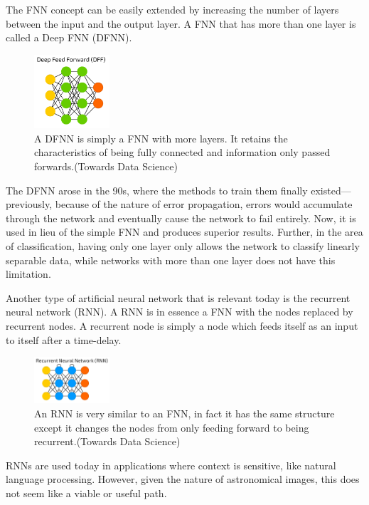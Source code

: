 \documentclass[a4paper,11pt]{article}
\begin{document}
The FNN concept can be easily extended by increasing the number of layers between the input and the output layer. A FNN that has more than one layer is called a Deep FNN (DFNN). 

\begin{figure}[ht]
\centering
\includegraphics[width=0.25\textwidth]{DFF.png}
\caption{\label{fig:FNN}A DFNN is simply a FNN with more layers. It retains the characteristics of being fully connected and information only passed forwards.(Towards Data Science)}
\end{figure}

The DFNN arose in the 90s, where the methods to train them finally existed—previously, because of the nature of error propagation, errors would accumulate through the network and eventually cause the network to fail entirely. Now, it is used in lieu of the simple FNN and produces superior results. Further, in the area of classification, having only one layer only allows the network to classify linearly separable data, while networks with more than one layer does not have this limitation.

Another type of artificial neural network that is relevant today is the recurrent neural network (RNN). A RNN is in essence a FNN with the nodes replaced by recurrent nodes. A recurrent node is simply a node which feeds itself as an input to itself after a time-delay. 
\begin{figure}[ht]
\centering
\includegraphics[width=0.25\textwidth]{RNN.png}
\caption{\label{fig:RNN}An RNN is very similar to an FNN, in fact it has the same structure except it changes the nodes from only feeding forward to being recurrent.(Towards Data Science)}
\end{figure}

RNNs are used today in applications where context is sensitive, like natural language processing. However, given the nature of astronomical images, this does not seem like a viable or useful path.
\end{document}
